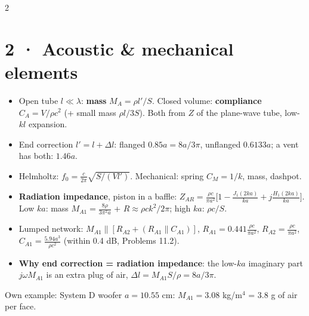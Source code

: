\documentclass[8pt]{extarticle}
\begin{document}
\begin{multicols}{2}
\section{2 · Acoustic \& mechanical elements}
\begin{itemize}
\item Open tube $l\ll\lambda$: \textbf{mass} $M_A=\rho l'/S$. Closed volume: \textbf{compliance} $C_A=V/\rho c^2$ (+ small mass $\rho l/3S$). Both from $Z$ of the plane-wave tube, low-$kl$ expansion.
\item End correction $l'=l+\Delta l$: flanged $0.85a=8a/3\pi$, unflanged $0.6133a$; a vent has both: $1.46a$.
\item Helmholtz: $f_0=\frac{c}{2\pi}\sqrt{S/(Vl')}$. Mechanical: spring $C_M=1/k$, mass, dashpot.
\item \textbf{Radiation impedance}, piston in a baffle: $Z_{AR}=\frac{\rho c}{\pi a^2}\big[1-\frac{J_1(2ka)}{ka}+j\frac{H_1(2ka)}{ka}\big]$. Low $ka$: mass $M_{A1}=\frac{8\rho}{3\pi^2a}$ + $R\approx\rho ck^2/2\pi$; high $ka$: $\rho c/S$.
\item Lumped network: $M_{A1}\parallel[R_{A2}+(R_{A1}\parallel C_{A1})]$, $R_{A1}=0.441\frac{\rho c}{\pi a^2}$, $R_{A2}=\frac{\rho c}{\pi a^2}$, $C_{A1}=\frac{5.94a^3}{\rho c^2}$ (within 0.4 dB, Problems 11.2).
\item \textbf{Why end correction = radiation impedance}: the low-$ka$ imaginary part $j\omega M_{A1}$ is an extra plug of air, $\Delta l=M_{A1}S/\rho=8a/3\pi$.
\end{itemize}
Own example: System D woofer $a=10.55$ cm: $M_{A1}=3.08$ kg/m$^4$ = 3.8 g of air per face.


\end{multicols}
\end{document}
